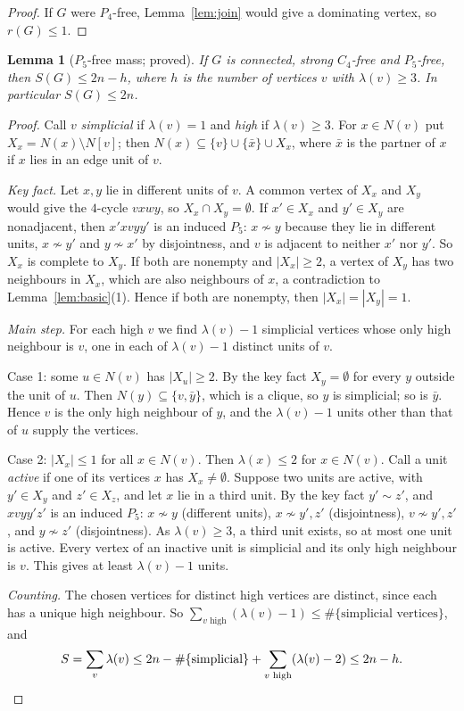 \documentclass[11pt]{amsart}
\newtheorem{lemma}[theorem]{Lemma}
\theoremstyle{definition}
\theoremstyle{remark}
\begin{document}
\begin{proof}
If $G$ were $P_4$-free, Lemma~\ref{lem:join} would give a dominating vertex, so $r(G)\le1$.
\end{proof}

\begin{lemma}[$P_5$-free mass; proved]\label{lem:p5}
If $G$ is connected, strong $C_4$-free and $P_5$-free, then $S(G)\le2n-h$, where $h$ is the number of vertices $v$ with $\lambda(v)\ge3$. In particular $S(G)\le2n$.
\end{lemma}

\begin{proof}
Call $v$ \emph{simplicial} if $\lambda(v)=1$ and \emph{high} if $\lambda(v)\ge3$. For $x\in N(v)$ put $X_x=N(x)\setminus N[v]$; then $N(x)\subseteq\{v\}\cup\{\bar x\}\cup X_x$, where $\bar x$ is the partner of $x$ if $x$ lies in an edge unit of $v$.

\emph{Key fact.} Let $x,y$ lie in different units of $v$. A common vertex of $X_x$ and $X_y$ would give the $4$-cycle $vxwy$, so $X_x\cap X_y=\emptyset$. If $x'\in X_x$ and $y'\in X_y$ are nonadjacent, then $x'xvyy'$ is an induced $P_5$: $x\not\sim y$ because they lie in different units, $x\not\sim y'$ and $y\not\sim x'$ by disjointness, and $v$ is adjacent to neither $x'$ nor $y'$. So $X_x$ is complete to $X_y$. If both are nonempty and $|X_x|\ge2$, a vertex of $X_y$ has two neighbours in $X_x$, which are also neighbours of $x$, a contradiction to Lemma~\ref{lem:basic}(1). Hence if both are nonempty, then $|X_x|=|X_y|=1$.

\emph{Main step.} For each high $v$ we find $\lambda(v)-1$ simplicial vertices whose only high neighbour is $v$, one in each of $\lambda(v)-1$ distinct units of $v$.

Case 1: some $u\in N(v)$ has $|X_u|\ge2$. By the key fact $X_y=\emptyset$ for every $y$ outside the unit of $u$. Then $N(y)\subseteq\{v,\bar y\}$, which is a clique, so $y$ is simplicial; so is $\bar y$. Hence $v$ is the only high neighbour of $y$, and the $\lambda(v)-1$ units other than that of $u$ supply the vertices.

Case 2: $|X_x|\le1$ for all $x\in N(v)$. Then $\lambda(x)\le2$ for $x\in N(v)$. Call a unit \emph{active} if one of its vertices $x$ has $X_x\ne\emptyset$. Suppose two units are active, with $y'\in X_y$ and $z'\in X_z$, and let $x$ lie in a third unit. By the key fact $y'\sim z'$, and $xvyy'z'$ is an induced $P_5$: $x\not\sim y$ (different units), $x\not\sim y',z'$ (disjointness), $v\not\sim y',z'$, and $y\not\sim z'$ (disjointness). As $\lambda(v)\ge3$, a third unit exists, so at most one unit is active. Every vertex of an inactive unit is simplicial and its only high neighbour is $v$. This gives at least $\lambda(v)-1$ units.

\emph{Counting.} The chosen vertices for distinct high vertices are distinct, since each has a unique high neighbour. So $\sum_{v\text{ high}}(\lambda(v)-1)\le\#\{\text{simplicial vertices}\}$, and
\[
S=\sum_v\lambda(v)\le 2n-\#\{\text{simplicial}\}+\sum_{v\text{ high}}(\lambda(v)-2)\le2n-h.\qedhere
\]
\end{proof}
\end{document}
